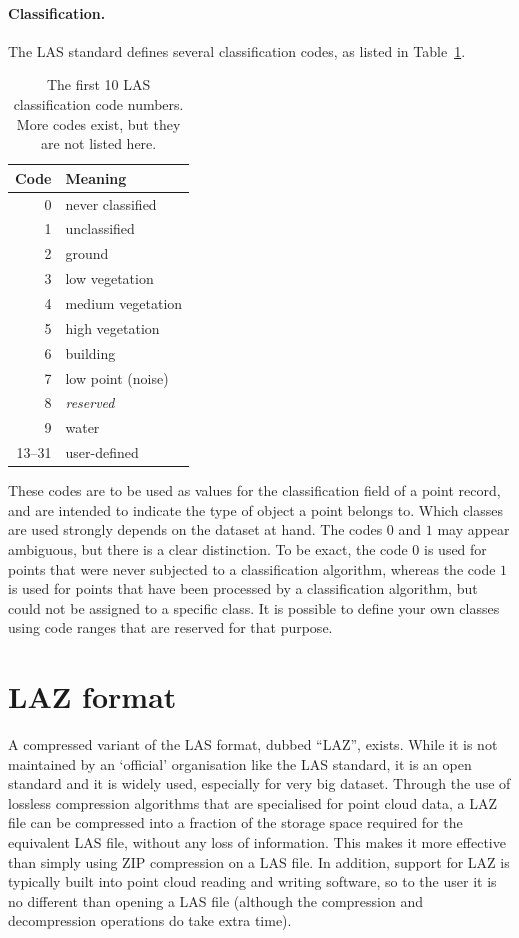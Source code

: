 \paragraph{Classification.}
The LAS standard defines several classification codes, as listed in Table~\ref{tab:las-classes}.
\begin{table}
  \centering
  \begin{tabular}{r|l}
  Code & Meaning \\ \midrule
  0 & never classified \\
  1 & unclassified \\
  2 & ground \\
  3 & low vegetation \\
  4 & medium vegetation \\
  5 & high vegetation \\
  6 & building \\
  7 & low point (noise) \\
  8 & \emph{reserved} \\
  9 & water \\
  13--31 & user-defined \\
\end{tabular}
\caption{The first 10 LAS classification code numbers. More codes exist, but they are not listed here.}%
\label{tab:las-classes}
\end{table}
These codes are to be used as values for the classification field of a point record, and are intended to indicate the type of object a point belongs to.
Which classes are used strongly depends on the dataset at hand.
The codes $0$ and $1$ may appear ambiguous, but there is a clear distinction.
To be exact, the code $0$ is used for points that were never subjected to a classification algorithm, whereas the code $1$ is used for points that have been processed by a classification algorithm, but could not be assigned to a specific class.
It is possible to define your own classes using code ranges that are reserved for that purpose.


\section{LAZ format}%
\label{sec:lazformat}%

A compressed variant of the LAS format, dubbed ``LAZ'', exists.
While it is not maintained by an `official' organisation like the LAS standard, it is an open standard and it is widely used, especially for very big dataset.
Through the use of lossless compression algorithms that are specialised for point cloud data, a LAZ file can be compressed into a fraction of the storage space required for the equivalent LAS file, without any loss of information.
This makes it more effective than simply using ZIP compression on a LAS file.
In addition, support for LAZ is typically built into point cloud reading and writing software, so to the user it is no different than opening a LAS file (although the compression and decompression operations do take extra time).

